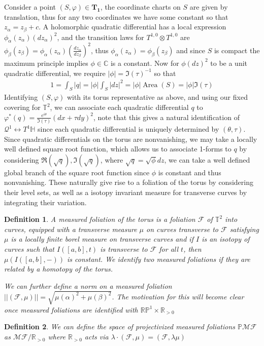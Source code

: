 \documentclass{article}
\newtheorem{defn}{Definition}
\newcommand{\abs}[1]{\left\vert#1\right\vert}
\newcommand{\norm}[1]{\lvert\lvert#1\rvert\rvert}
\begin{document}
        Consider a point \((S,\varphi) \in \mathbf{T_1}\), the coordinate charts on \(S\) are given by translation, thus for any two coordinates we have some constant so that \(z_\alpha = z_\beta + c\). A holomorphic quadratic differential has a local expression \(\phi_\alpha(z_\alpha)(dz_\alpha)^2\), and the transition laws for \(T^{1,0} \otimes T^{1,0}\) are \(\phi_\beta(z_\beta) = \phi_\alpha(z_\alpha)\left(\frac{dz_\alpha}{dz_\beta}\right)^2\), thus \(\phi_\alpha(z_\alpha) = \phi_\beta(z_\beta)\) and since \(S\) is compact the maximum principle implies \(\phi \in \mathbb{C}\) is a constant. Now for \(\phi (dz)^2\) to be a unit quadratic differential, we require \(\abs{\phi} = \Im(\tau)^{-1}\) so that
        \begin{align*}
            1 = \int_S \abs{q} = \abs{\phi}\int_S \abs{dz}^2 = \abs{\phi}\operatorname{Area}(S) = \abs{\phi}\Im(\tau)
        \end{align*}
        Identifying \((S,\varphi)\) with its torus representative as above, and using our fixed covering for \(\mathbb{T}^2\), we can associate each quadratic differential \(q\) to \(\varphi^*(q) = \frac{e^{i\theta}}{\Im(\tau)}(dx + \tau dy)^2\), note that this gives a natural identification of \(\mathcal{Q}^1 \longleftrightarrow T^1 \mathbb{H}\) since each quadratic differential is uniquely determined by \((\theta,\tau)\). Since quadratic differentials on the torus are nonvanishing, we may take a locally well defined square root function, which allows us to associate 1-forms to \(q\) by considering \(\Re(\sqrt{q}),\Im(\sqrt{q})\), where \(\sqrt{q} = \sqrt{\phi}dz\), we can take a well defined global branch of the square root function since \(\phi\) is constant and thus nonvanishing. These naturally give rise to a foliation of the torus by considering their level sets, as well as a isotopy invariant measure for transverse curves by integrating their variation.

        \begin{defn}
            A measured foliation of the torus is a foliation \(\mathcal{F}\) of \(\mathbb{T}^2\) into curves, equipped with a transverse measure \(\mu\) on curves transverse to \(\mathcal{F}\) satisfying \(\mu\) is a locally finite borel measure on transverse curves and if \(I\) is an isotopy of curves such that \(I([a,b],t)\) is transverse to \(\mathcal{F}\) for all \(t\), then \(\mu(I([a,b],-))\) is constant. We identify two measured foliations if they are related by a homotopy of the torus.

            We can further define a norm on a measured foliation \(\norm{(\mathcal{F},\mu)} = \sqrt{\mu(\alpha)^2 + \mu(\beta)^2}\). The motivation for this will become clear once measured foliations are identified with \(\mathbb{RP}^1 \times \mathbb{R}_{>0}\)
        \end{defn}
        \begin{defn}
            We can define the space of projectivized measured foliations \(\mathbb{P}\mathscr{MF}\) as \(\mathscr{MF}/\mathbb{R}_{>0}\) where \(\mathbb{R}_{>0}\) acts via \(\lambda\cdot(\mathcal{F},\mu) = (\mathcal{F},\lambda\mu)\)
        \end{defn}
\end{document}

